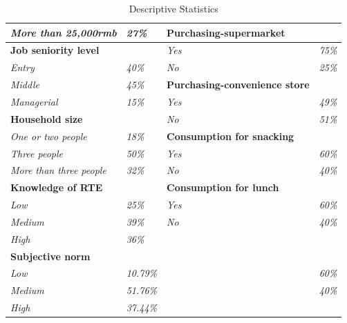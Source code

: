 \documentclass[12pt]{beamer}
\begin{document}
\begin{frame}
\begin{table}[H]
\begin{tabular}{l|l|l|l}
			\textit{More than 25,000rmb}      & \textit{27\%}      & \textbf{Purchasing-supermarket}       & \textit{}          \\ \hline
			\textbf{Job seniority level}      & \textit{}          & \textit{Yes}                                   & \textit{75\%}      \\ \hline
			\textit{Entry}                    & \textit{40\%}      & \textit{No}                                    & \textit{25\%}      \\ \hline
			\textit{Middle}                   & \textit{45\%}      & \textbf{Purchasing-convenience store} & \textit{}          \\ \hline
			\textit{Managerial}               & \textit{15\%}      & \textit{Yes}                                   & \textit{49\%}      \\ \hline
			\textbf{Household size}           & \textit{}          & \textit{No}                                    & \textit{51\%}      \\ \hline
			\textit{One or two people}        & \textit{18\%}      & \textbf{Consumption for snacking}              & \textit{}          \\ \hline
			\textit{Three people}             & \textit{50\%}      & \textit{Yes}                                   & \textit{60\%}      \\ \hline
			\textit{More than three people}   & \textit{32\%}      & \textit{No}                                    & \textit{40\%}      \\ \hline
			\textbf{Knowledge of RTE}         & \textit{}          & \textbf{Consumption for lunch}                 & \textit{}          \\ \hline
			\textit{Low}                      & \textit{25\%}      & \textit{Yes}                                   & \textit{60\%}      \\ \hline
			\textit{Medium}                   & \textit{39\%}      & \textit{No}                                    & \textit{40\%}      \\ \hline
			\textit{High}                     & \textit{36\%}      &                                                & \textit{}          \\ \hline
			
			\textbf{Subjective norm}          & \textit{}          & \textbf{}                 & \textit{}          \\ \hline
			\textit{Low}                      & \textit{10.79\%}      & \textit{}                                   & \textit{60\%}      \\ \hline
			\textit{Medium}                   & \textit{51.76\%}      & \textit{}                                    & \textit{40\%}      \\ \hline
			\textit{High}                     & \textit{37.44\%}      &                                                & \textit{}          \\ \hline
			
		\end{tabular}
		\caption{Descriptive Statistics}
		\label{table:statistics}
	\end{table}
\end{frame}
\end{document}
